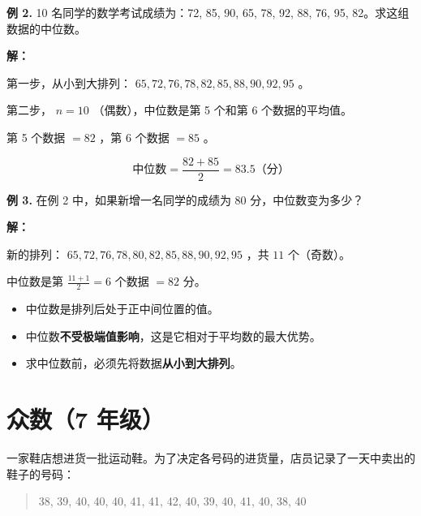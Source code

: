 \begin{workedexamples}


\textbf{例 2.} 10 名同学的数学考试成绩为：72, 85, 90, 65, 78, 92, 88, 76, 95, 82。求这组数据的中位数。

\textbf{解：}

第一步，从小到大排列： $65, 72, 76, 78, 82, 85, 88, 90, 92, 95$ 。

第二步， $n = 10$ （偶数），中位数是第 5 个和第 6 个数据的平均值。

第 5 个数据 $= 82$ ，第 6 个数据 $= 85$ 。

\[
\text{中位数} = \frac{82 + 85}{2} = 83.5 \text{（分）}
\]


\textbf{例 3.} 在例 2 中，如果新增一名同学的成绩为 80 分，中位数变为多少？

\textbf{解：}

新的排列： $65, 72, 76, 78, 80, 82, 85, 88, 90, 92, 95$ ，共 $11$ 个（奇数）。

中位数是第 $\frac{11+1}{2} = 6$ 个数据 $= 82$ 分。

\end{workedexamples}

\begin{keytakeaway}


\begin{itemize}
  \item 中位数是排列后处于正中间位置的值。
  \item 中位数\textbf{不受极端值影响}，这是它相对于平均数的最大优势。
  \item 求中位数前，必须先将数据\textbf{从小到大排列}。
\end{itemize}


\end{keytakeaway}



\section*{众数（7 年级）}


\begin{explore}


一家鞋店想进货一批运动鞋。为了决定各号码的进货量，店员记录了一天中卖出的鞋子的号码：

\end{explore}

\begin{quote}
38, 39, 40, 40, 40, 41, 41, 42, 40, 39, 40, 41, 40, 38, 40
\end{quote}


